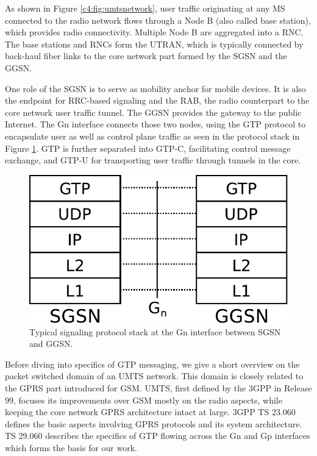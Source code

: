 As shown in Figure \ref{c4:fig:umtsnetwork}, user traffic originating at any \gls{MS} connected to the radio network flows through a Node B (also called base station), which provides radio connectivity. Multiple Node B are aggregated into a \gls{RNC}. The base stations and \glspl{RNC} form the \gls{UTRAN}, which is typically connected by back-haul fiber links to the core network part formed by the \gls{SGSN} and the \gls{GGSN}.

One role of the \gls{SGSN} is to serve as mobility anchor for mobile devices. It is also the endpoint for \gls{RRC}-based signaling and the \gls{RAB}, the radio counterpart to the core network user traffic tunnel. The \gls{GGSN} provides the gateway to the public Internet. The Gn interface connects those two nodes, using the \gls{GTP} protocol to encapsulate user as well as control plane traffic as seen in the protocol stack in Figure \ref{c4:fig:signallingstack}. \gls{GTP} is further separated into GTP-C, facilitating control message exchange, and GTP-U for transporting user traffic through tunnels in the core.

\begin{figure}[htb]
	\centering
	\includegraphics[width=0.6\columnwidth]{images/signalling-stack.pdf}
	\caption{Typical signaling protocol stack at the Gn interface between \gls{SGSN} and \gls{GGSN}.}
	\label{c4:fig:signallingstack}
\end{figure}


Before diving into specifics of \gls{GTP} messaging, we give a short overview on the packet switched domain of an \gls{UMTS} network. This domain is closely related to the \gls{GPRS} part introduced for \acrshort{GSM}. \gls{UMTS}, first defined by the \gls{3GPP} in Release 99, focuses its improvements over \gls{GSM} mostly on the radio aspects, while keeping the core network \gls{GPRS} architecture intact at large. \gls{3GPP} \gls{TS} 23.060 \cite{3gpp23.060} defines the basic aspects involving \gls{GPRS} protocols and its system architecture. \gls{TS} 29.060 \cite{3gpp29.060} describes the specifics of \gls{GTP} flowing across the Gn and Gp interfaces which forms the basis for our work.

